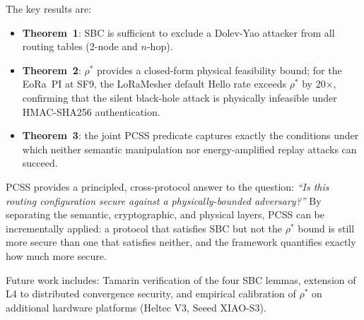 \documentclass[journal,compsoc]{IEEEtran}
\theoremstyle{plain}
\theoremstyle{definition}
\theoremstyle{remark}
\newcommand{\rhostar}{\rho^*}
\newcommand{\hmac}{\textsf{HMAC-SHA256}}
\begin{document}
The key results are:
\begin{itemize}[nosep]
  \item \textbf{Theorem~1}: SBC is sufficient to exclude a
        Dolev-Yao attacker from all routing tables (2-node and $n$-hop).
  \item \textbf{Theorem~2}: $\rhostar$ provides a closed-form physical
        feasibility bound; for the EoRa~PI at SF9, the LoRaMesher
        default Hello rate exceeds $\rhostar$ by 20$\times$, confirming
        that the silent black-hole attack is physically infeasible under
        \hmac{} authentication.
  \item \textbf{Theorem~3}: the joint PCSS predicate captures exactly
        the conditions under which neither semantic manipulation nor
        energy-amplified replay attacks can succeed.
\end{itemize}

PCSS provides a principled, cross-protocol answer to the question:
\emph{``Is this routing configuration secure against a physically-bounded
adversary?''}  By separating the semantic, cryptographic, and physical
layers, PCSS can be incrementally applied: a protocol that satisfies SBC
but not the $\rhostar$ bound is still more secure than one that satisfies
neither, and the framework quantifies exactly how much more secure.

Future work includes: Tamarin verification of the four SBC lemmas, extension
of L4 to distributed convergence security, and empirical calibration of
$\rhostar$ on additional hardware platforms (Heltec V3, Seeed XIAO-S3).



\end{document}

